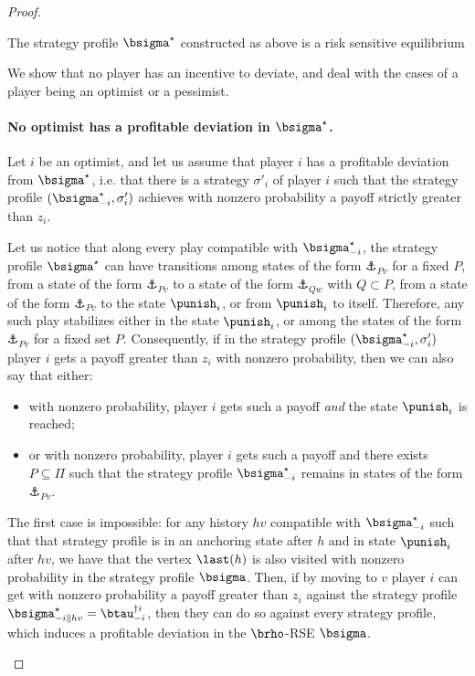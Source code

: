 \begin{proof}
\begin{proposition}
    The strategy profile $\bsigma^\star$ constructed as above is a risk sensitive equilibrium
\end{proposition}
\begin{claimproof}
    We show that no player has an incentive to deviate, and deal with the cases 
    of a player being an optimist or a pessimist. 
    \paragraph*{No optimist has a profitable deviation in $\bsigma^\star$.}

    Let $i$ be an optimist, and let us assume that player $i$ has a profitable deviation from $\bsigma^\star$, i.e. that there is a strategy $\sigma'_i$ of player $i$ such that the strategy profile $(\bsigma^\star_{-i}, \sigma'_i)$ achieves with nonzero probability a payoff strictly greater than $z_i$.

    Let us notice that along every play compatible with $\bsigma^\star_{-i}$, the strategy profile $\bsigma^\star$ can have transitions among states of the form $\anchor_{P v}$ for a fixed $P$, from a state of the form $\anchor_{P v}$ to a state of the form $\anchor_{Q w}$ with $Q \subset P$, from a state of the form $\anchor_{P v}$ to the state $\punish_i$, or from $\punish_i$ to itself.
    Therefore, any such play stabilizes either in the state $\punish_i$, or among the states of the form $\anchor_{P v}$ for a fixed set $P$.
    Consequently, if in the strategy profile $(\bsigma^\star_{-i}, \sigma'_i)$ player $i$ gets a payoff greater than $z_i$ with nonzero probability, then we can also say that either:
    \begin{itemize}
        \item with nonzero probability, player $i$ gets such a payoff \emph{and} the state $\punish_i$ is reached;

        \item or with nonzero probability, player $i$ gets such a payoff and there exists $P \subseteq \Pi$ such that the strategy profile $\bsigma^\star_{-i}$ remains in states of the form $\anchor_{P v}$.
    \end{itemize}

    The first case is impossible: for any history $hv$ compatible with $\bsigma^\star_{-i}$ such that that strategy profile is in an anchoring state after $h$ and in state $\punish_i$ after $hv$, we have that the vertex $\last(h)$ is also visited with nonzero probability in the strategy profile $\bsigma$.
    Then, if by moving to $v$ player $i$ can get with nonzero probability a payoff greater than $z_i$ against the strategy profile $\bsigma^\star_{-i\|hv} = \btau^{\dag i}_{-i}$, then they can do so against every strategy profile, which induces a profitable deviation in the $\brho$-RSE $\bsigma$.


\end{claimproof}
\end{proof}
